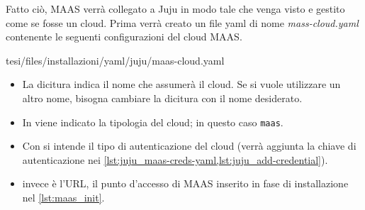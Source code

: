 \bigskip\noindent
Fatto ciò, MAAS verrà collegato a Juju in modo tale che venga visto e gestito come se fosse un cloud.
% 
Prima verrà creato un file yaml di nome \emph{mass-cloud.yaml} contenente le seguenti configurazioni del cloud MAAS.
% 

{tesi/files/installazioni/yaml/juju/maas-cloud.yaml}
%
\begin{itemize}
    \item La dicitura  indica il nome che assumerà il cloud.
    Se si vuole utilizzare un altro nome, bisogna cambiare la dicitura  con il nome desiderato.

    \item In  viene indicato la tipologia del cloud; in questo caso \texttt{maas}.

    \item Con  si intende il tipo di autenticazione del cloud (verrà aggiunta la chiave di autenticazione nei \cref{lst:juju_maas-creds-yaml,lst:juju_add-credential}).

    \item {} invece è l'URL, il punto d'accesso di MAAS inserito in fase di installazione nel \cref{lst:maas_init}.
\end{itemize}

